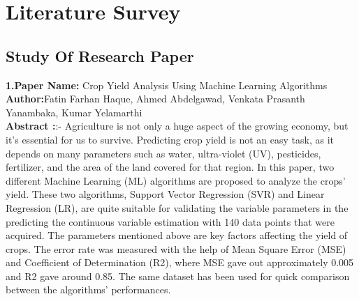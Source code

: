 \documentclass[oneside,a4paper,12pt]{report}
\begin{document}
\chapter{Literature Survey}
\section {Study Of Research Paper}
\item \textbf{1.Paper Name:} Crop Yield Analysis Using Machine Learning 
Algorithms
\\
\textbf{Author:}Fatin Farhan Haque, Ahmed Abdelgawad, Venkata Prasanth Yanambaka, Kumar Yelamarthi \\
\textbf{Abstract :}:- Agriculture is not only a huge aspect of the 
growing economy, but it’s essential for us to survive. Predicting 
crop yield is not an easy task, as it depends on many parameters 
such as water, ultra-violet (UV), pesticides, fertilizer, and the 
area of the land covered for that region. In this paper, two 
different Machine Learning (ML) algorithms are proposed to 
analyze the crops’ yield. These two algorithms, Support Vector 
Regression (SVR) and Linear Regression (LR), are quite 
suitable for validating the variable parameters in the predicting 
the continuous variable estimation with 140 data points that 
were acquired. The parameters mentioned above are key factors 
affecting the yield of crops. The error rate was measured with 
the help of Mean Square Error (MSE) and Coefficient of 
Determination (R2), where MSE gave out approximately 0.005 
and R2 gave around 0.85. The same dataset has been used for 
quick comparison between the algorithms’ performances. \\

\newpage
\end{document}
